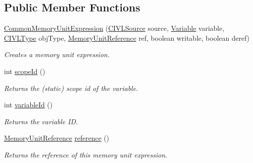 \subsection*{Public Member Functions}
\begin{DoxyCompactItemize}
\item 
\hyperlink{classedu_1_1udel_1_1cis_1_1vsl_1_1civl_1_1model_1_1common_1_1expression_1_1CommonMemoryUnitExpression_a77cf0f0788c8ad7b53c3f6a0a1e19074}{Common\+Memory\+Unit\+Expression} (\hyperlink{interfaceedu_1_1udel_1_1cis_1_1vsl_1_1civl_1_1model_1_1IF_1_1CIVLSource}{C\+I\+V\+L\+Source} source, \hyperlink{interfaceedu_1_1udel_1_1cis_1_1vsl_1_1civl_1_1model_1_1IF_1_1variable_1_1Variable}{Variable} variable, \hyperlink{interfaceedu_1_1udel_1_1cis_1_1vsl_1_1civl_1_1model_1_1IF_1_1type_1_1CIVLType}{C\+I\+V\+L\+Type} obj\+Type, \hyperlink{interfaceedu_1_1udel_1_1cis_1_1vsl_1_1civl_1_1model_1_1IF_1_1expression_1_1reference_1_1MemoryUnitReference}{Memory\+Unit\+Reference} ref, boolean writable, boolean deref)
\begin{DoxyCompactList}\small\item\em Creates a memory unit expression. \end{DoxyCompactList}\item 
int \hyperlink{classedu_1_1udel_1_1cis_1_1vsl_1_1civl_1_1model_1_1common_1_1expression_1_1CommonMemoryUnitExpression_a7cdd0a6ec474eb1e191658ce5b535f88}{scope\+Id} ()
\begin{DoxyCompactList}\small\item\em Returns the (static) scope id of the variable. \end{DoxyCompactList}\item 
int \hyperlink{classedu_1_1udel_1_1cis_1_1vsl_1_1civl_1_1model_1_1common_1_1expression_1_1CommonMemoryUnitExpression_a3c1ae210dce078779d6d249ee1c56b82}{variable\+Id} ()
\begin{DoxyCompactList}\small\item\em Returns the variable I\+D. \end{DoxyCompactList}\item 
\hyperlink{interfaceedu_1_1udel_1_1cis_1_1vsl_1_1civl_1_1model_1_1IF_1_1expression_1_1reference_1_1MemoryUnitReference}{Memory\+Unit\+Reference} \hyperlink{classedu_1_1udel_1_1cis_1_1vsl_1_1civl_1_1model_1_1common_1_1expression_1_1CommonMemoryUnitExpression_af9eaa7d07a6f74cd84428e089ea880fe}{reference} ()
\begin{DoxyCompactList}\small\item\em Returns the reference of this memory unit expression. \end{DoxyCompactList}\item 

\end{DoxyCompactItemize}
